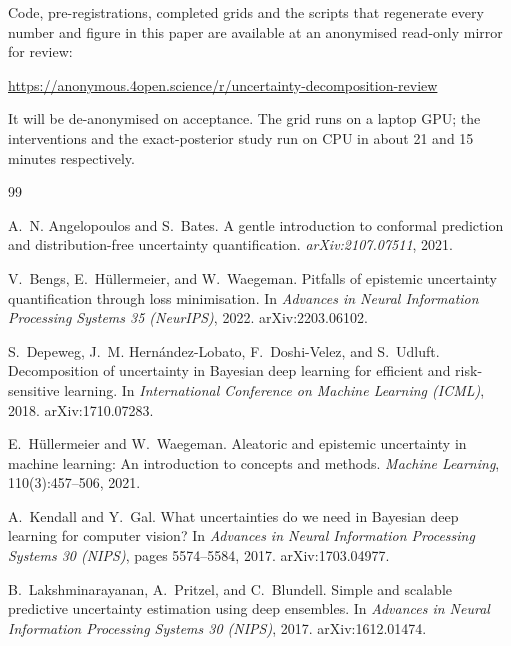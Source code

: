 \documentclass[10pt]{article}
\begin{document}
Code, pre-registrations, completed grids and the scripts that regenerate every number and
figure in this paper are available at an anonymised read-only mirror for review:
\begin{center}
\url{https://anonymous.4open.science/r/uncertainty-decomposition-review}
\end{center}
\noindent It will be de-anonymised on acceptance. The grid runs on a laptop GPU; the
interventions and the exact-posterior study run on CPU in about 21 and 15 minutes
respectively.

\begin{thebibliography}{99}
\small

A.~N. Angelopoulos and S.~Bates.
\newblock A gentle introduction to conformal prediction and distribution-free uncertainty
quantification.
\newblock \emph{arXiv:2107.07511}, 2021.

V.~Bengs, E.~H\"ullermeier, and W.~Waegeman.
\newblock Pitfalls of epistemic uncertainty quantification through loss minimisation.
\newblock In \emph{Advances in Neural Information Processing Systems 35 (NeurIPS)}, 2022.
arXiv:2203.06102.

S.~Depeweg, J.~M. Hern\'andez-Lobato, F.~Doshi-Velez, and S.~Udluft.
\newblock Decomposition of uncertainty in Bayesian deep learning for efficient and risk-sensitive
learning.
\newblock In \emph{International Conference on Machine Learning (ICML)}, 2018.
arXiv:1710.07283.

E.~H\"ullermeier and W.~Waegeman.
\newblock Aleatoric and epistemic uncertainty in machine learning: An introduction to concepts
and methods.
\newblock \emph{Machine Learning}, 110(3):457--506, 2021.

A.~Kendall and Y.~Gal.
\newblock What uncertainties do we need in Bayesian deep learning for computer vision?
\newblock In \emph{Advances in Neural Information Processing Systems 30 (NIPS)}, pages
5574--5584, 2017. arXiv:1703.04977.

B.~Lakshminarayanan, A.~Pritzel, and C.~Blundell.
\newblock Simple and scalable predictive uncertainty estimation using deep ensembles.
\newblock In \emph{Advances in Neural Information Processing Systems 30 (NIPS)}, 2017.
arXiv:1612.01474.


\end{thebibliography}
\end{document}

